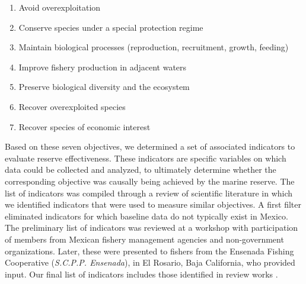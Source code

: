 \documentclass[10pt,letterpaper]{article}
\begin{document}
\begin{enumerate}
  \item Avoid overexploitation
  \item Conserve species under a special protection regime
  \item Maintain biological processes (reproduction, recruitment, growth, feeding)
  \item Improve fishery production in adjacent waters
  \item Preserve biological diversity and the ecosystem
  \item Recover overexploited species
  \item Recover species of economic interest
\end{enumerate}

Based on these seven objectives, we determined a set of associated indicators to evaluate reserve effectiveness. These indicators are specific variables on which data could be collected and analyzed, to ultimately determine whether the corresponding objective was causally being achieved by the marine reserve. The list of indicators was compiled through a review of scientific literature in which we identified indicators that were used to measure similar objectives\cite{lester_2017-nh,sala_2017-69,chirico_2017-Rz,edgar_2014-UO,rodriguez_2017-PD,rossetto_2015-V0,betti_2017-lq,sala_2016-PV,woodcock_2017-Wm,friedlander_2017-oI,moland_2013-VP,aburtooropeza_2011-ya,guidetti_2014-8Z,lester_2008-F_,lester_2009-Ks,pomeroy_2005-Py,pomeroy_2004-23}. A first filter eliminated indicators for which baseline data do not typically exist in Mexico. The preliminary list of indicators was reviewed at a workshop with participation of members from Mexican fishery management agencies and non-government organizations. Later, these were presented to fishers from the Ensenada Fishing Cooperative (\emph{S.C.P.P. Ensenada}), in El Rosario, Baja California, who provided input. Our final list of indicators includes those identified in review works \cite{lester_2009-Ks,woodcock_2017-Wm}.
\end{document}
